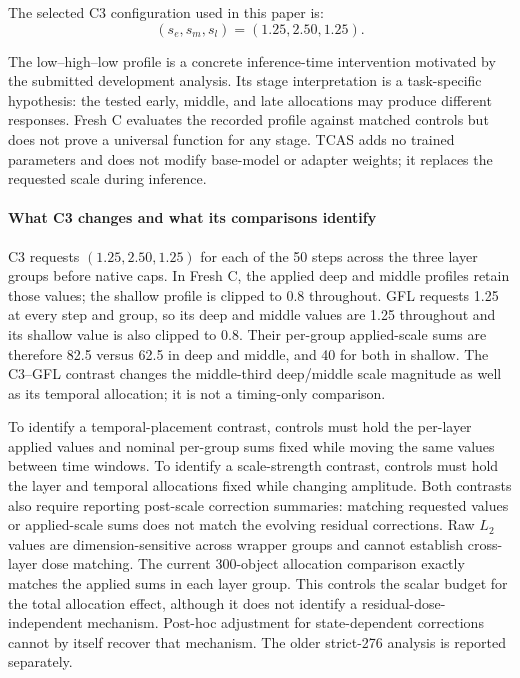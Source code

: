 \documentclass[times,twocolumn,final]{elsarticle}
\begin{document}
The selected C3 configuration used in this paper is:
\begin{equation}
(s_e, s_m, s_l) = (1.25, 2.50, 1.25).
\end{equation}

The low--high--low profile is a concrete inference-time intervention motivated by the submitted development analysis. Its stage interpretation is a task-specific hypothesis: the tested early, middle, and late allocations may produce different responses. Fresh C evaluates the recorded profile against matched controls but does not prove a universal function for any stage. TCAS adds no trained parameters and does not modify base-model or adapter weights; it replaces the requested scale during inference.

\paragraph{What C3 changes and what its comparisons identify}
C3 requests $(1.25,2.50,1.25)$ for each of the 50 steps across the three layer groups before native caps. In Fresh C, the applied deep and middle profiles retain those values; the shallow profile is clipped to 0.8 throughout. GFL requests 1.25 at every step and group, so its deep and middle values are 1.25 throughout and its shallow value is also clipped to 0.8. Their per-group applied-scale sums are therefore 82.5 versus 62.5 in deep and middle, and 40 for both in shallow. The C3--GFL contrast changes the middle-third deep/middle scale magnitude as well as its temporal allocation; it is not a timing-only comparison.

To identify a temporal-placement contrast, controls must hold the per-layer applied values and nominal per-group sums fixed while moving the same values between time windows. To identify a scale-strength contrast, controls must hold the layer and temporal allocations fixed while changing amplitude. Both contrasts also require reporting post-scale correction summaries: matching requested values or applied-scale sums does not match the evolving residual corrections. Raw $L_2$ values are dimension-sensitive across wrapper groups and cannot establish cross-layer dose matching. The current 300-object allocation comparison exactly matches the applied sums in each layer group. This controls the scalar budget for the total allocation effect, although it does not identify a residual-dose-independent mechanism. Post-hoc adjustment for state-dependent corrections cannot by itself recover that mechanism. The older strict-276 analysis is reported separately.
\end{document}
